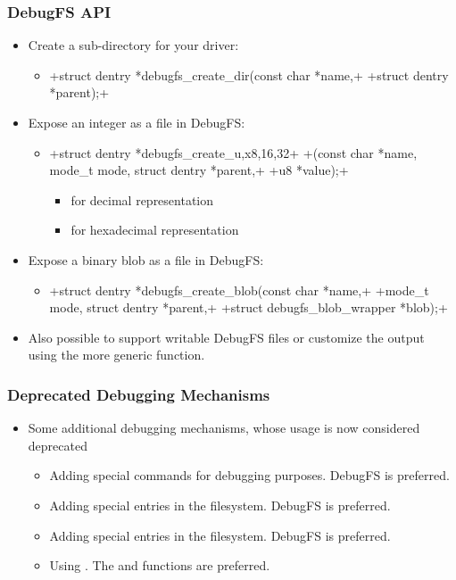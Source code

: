 \begin{frame}[fragile]
  \frametitle{DebugFS API}
  \begin{itemize}
  \item Create a sub-directory for your driver:
    \begin{itemize}
    \item {}+struct dentry *debugfs_create_dir(const char *name,+
      +struct dentry *parent);+
    \end{itemize}
  \item Expose an integer as a file in DebugFS:
    \begin{itemize}
    \item {}+struct dentry *debugfs_create_{u,x}{8,16,32}+
      +(const char *name, mode_t mode, struct dentry *parent,+
      +u8 *value);+
      \begin{itemize}
      \item {} for decimal representation
      \item {} for hexadecimal representation
      \end{itemize}
    \end{itemize}
  \item Expose a binary blob as a file in DebugFS:
    \begin{itemize}
    \item {}+struct dentry *debugfs_create_blob(const char *name,+
      +mode_t mode, struct dentry *parent,+
      +struct debugfs_blob_wrapper *blob);+
    \end{itemize}
  \item Also possible to support writable DebugFS files or customize
    the output using the more generic 
    function.
  \end{itemize}
\end{frame}

\begin{frame}
  \frametitle{Deprecated Debugging Mechanisms}
  \begin{itemize}
  \item Some additional debugging mechanisms, whose usage is now
    considered deprecated
    \begin{itemize}
    \item Adding special  commands for debugging
      purposes. DebugFS is preferred.
    \item Adding special entries in the  filesystem. DebugFS is
      preferred.
    \item Adding special entries in the  filesystem. DebugFS is
      preferred.
    \item Using . The  and 
      functions are preferred.
    \end{itemize}
  \end{itemize}
\end{frame}

